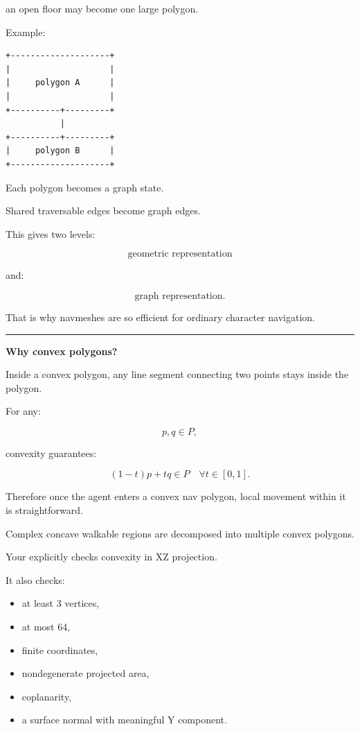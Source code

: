 an open floor may become one large polygon.

Example:

\begin{verbatim}
+--------------------+
|                    |
|     polygon A      |
|                    |
+----------+---------+
           |
+----------+---------+
|     polygon B      |
+--------------------+
\end{verbatim}

Each polygon becomes a graph state.

Shared traversable edges become graph edges.

This gives two levels:

\[
\text{geometric representation}
\]

and:

\[
\text{graph representation}.
\]

That is why navmeshes are so efficient for ordinary character navigation.

\begin{center}\rule{0.5\linewidth}{0.5pt}\end{center}

\textbf{Why convex polygons?}

Inside a convex polygon, any line segment connecting two points stays inside the polygon.

For any:

\[
p,q\in P,
\]

convexity guarantees:

\[
(1-t)p+tq\in P
\quad
\forall t\in[0,1].
\]

Therefore once the agent enters a convex nav polygon, local movement within it is straightforward.

Complex concave walkable regions are decomposed into multiple convex polygons.

Your  explicitly checks convexity in XZ projection.

It also checks:

\begin{itemize}
\tightlist
\item
  at least 3 vertices,
\item
  at most 64,
\item
  finite coordinates,
\item
  nondegenerate projected area,
\item
  coplanarity,
\item
  a surface normal with meaningful Y component.
\end{itemize}

